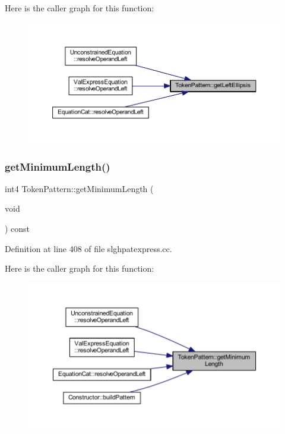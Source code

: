 Here is the caller graph for this function\+:
\nopagebreak
\begin{figure}[H]
\begin{center}
\leavevmode
\includegraphics[width=350pt]{class_token_pattern_a210e879f22d138ce4729978c61c1ae07_icgraph}
\end{center}
\end{figure}
\mbox{\label{class_token_pattern_aec7adadfdac70df18433ca8599dfb37f}} 
\subsubsection{\texorpdfstring{getMinimumLength()}{getMinimumLength()}}
{\footnotesize\ttfamily int4 Token\+Pattern\+::get\+Minimum\+Length (\begin{DoxyParamCaption}\item[{void}]{ }\end{DoxyParamCaption}) const}



Definition at line 408 of file slghpatexpress.\+cc.

Here is the caller graph for this function\+:
\nopagebreak
\begin{figure}[H]
\begin{center}
\leavevmode
\includegraphics[width=350pt]{class_token_pattern_aec7adadfdac70df18433ca8599dfb37f_icgraph}
\end{center}
\end{figure}
\mbox{\label{class_token_pattern_ac757e6b2e8d8837f950325ca8669ec43}} 
